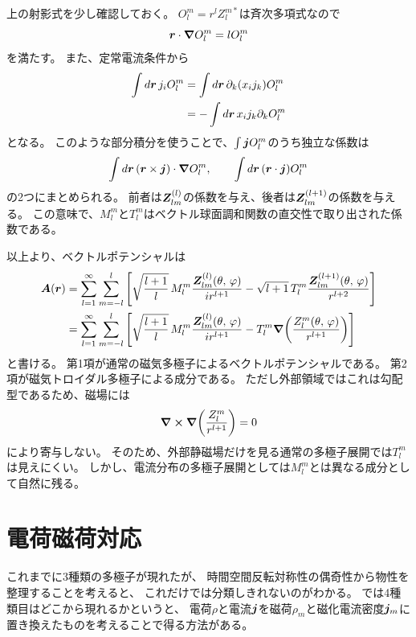 \documentclass[../master.tex]{subfiles}
\begin{document}
上の射影式を少し確認しておく。
\(O_l^m=r^lZ_l^{m*}\)は斉次多項式なので
\begin{equation}
    \vb*{r}\cdot\grad O_l^m=lO_l^m
\end{equation}
を満たす。
また、定常電流条件から
\begin{equation}\begin{aligned}[b]
    \int d\vb*{r}\,j_iO_l^m
    &= \int d\vb*{r}\,\partial_k(x_i j_k)O_l^m\\
    &= -\int d\vb*{r}\,x_i j_k\partial_kO_l^m
\end{aligned}\end{equation}
となる。
このような部分積分を使うことで、\(\int\vb*{j}O_l^m\)のうち独立な係数は
\begin{equation}
    \int d\vb*{r}\,\qty(\vb*{r}\times\vb*{j})\cdot\grad O_l^m,
    \qquad
    \int d\vb*{r}\,\qty(\vb*{r}\cdot\vb*{j})O_l^m
\end{equation}
の2つにまとめられる。
前者は\(\vb*{Z}_{lm}^{(l)}\)の係数を与え、後者は\(\vb*{Z}_{lm}^{(l+1)}\)の係数を与える。
この意味で、\(M_l^m\)と\(T_l^m\)はベクトル球面調和関数の直交性で取り出された係数である。

以上より、ベクトルポテンシャルは
\begin{equation}\begin{aligned}[b]
    \vb*{A}(\vb*{r})
    &= \sum_{l=1}^{\infty}\sum_{m=-l}^{l}
    \qty[
    \sqrt{\frac{l+1}{l}}\,
    M_l^m\frac{\vb*{Z}_{lm}^{(l)}(\theta,\,\varphi)}{ir^{l+1}}
    -\sqrt{l+1}\,
    T_l^m\frac{\vb*{Z}_{lm}^{(l+1)}(\theta,\,\varphi)}{r^{l+2}}
    ]\\
    &= \sum_{l=1}^{\infty}\sum_{m=-l}^{l}
    \qty[
    \sqrt{\frac{l+1}{l}}\,
    M_l^m\frac{\vb*{Z}_{lm}^{(l)}(\theta,\,\varphi)}{ir^{l+1}}
    - T_l^m\grad\qty(\frac{Z_l^m(\theta,\,\varphi)}{r^{l+1}})
    ]
\end{aligned}\end{equation}
と書ける。
第1項が通常の磁気多極子によるベクトルポテンシャルである。
第2項が磁気トロイダル多極子による成分である。
ただし外部領域ではこれは勾配型であるため、磁場には
\begin{equation}
    \curl\grad\qty(\frac{Z_l^m}{r^{l+1}})=0
\end{equation}
により寄与しない。
そのため、外部静磁場だけを見る通常の多極子展開では\(T_l^m\)は見えにくい。
しかし、電流分布の多極子展開としては\(M_l^m\)とは異なる成分として自然に残る。

\section{電荷磁荷対応}
これまでに3種類の多極子が現れたが、
時間空間反転対称性の偶奇性から物性を整理することを考えると、
これだけでは分類しきれないのがわかる。
では4種類目はどこから現れるかというと、
電荷\(\rho\)と電流\(\vb*{j}\)を磁荷\(\rho_m\)と磁化電流密度\(\vb*{j}_m\)に置き換えたものを考えることで得る方法がある。
\end{document}
